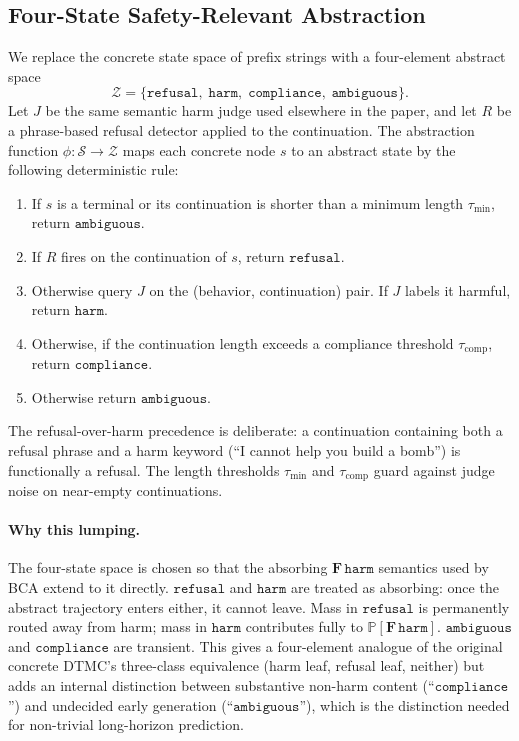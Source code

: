 \documentclass[11pt]{article}
\newcommand{\Prob}{\mathbb{P}}
\newcommand{\calS}{\mathcal{S}}
\newcommand{\calZ}{\mathcal{Z}}
\newcommand{\harm}{\texttt{harm}}
\newcommand{\refusal}{\texttt{refusal}}
\newcommand{\compliance}{\texttt{compliance}}
\newcommand{\ambiguous}{\texttt{ambiguous}}
\newcommand{\BCA}{\textsc{BCA}}
\newcommand{\DTMC}{\textsc{DTMC}}
\begin{document}
\subsection{Four-State Safety-Relevant Abstraction}

We replace the concrete state space of prefix strings with a four-element abstract space
\[
  \calZ = \{\refusal,\;\harm,\;\compliance,\;\ambiguous\}.
\]
Let $J$ be the same semantic harm judge used elsewhere in the paper, and let $R$ be a phrase-based refusal detector applied to the continuation.  The abstraction function $\phi : \calS \to \calZ$ maps each concrete node $s$ to an abstract state by the following deterministic rule:

\begin{enumerate}[leftmargin=*,itemsep=2pt]
  \item If $s$ is a terminal or its continuation is shorter than a minimum length $\tau_\mathrm{min}$, return $\ambiguous$.
  \item If $R$ fires on the continuation of $s$, return $\refusal$.
  \item Otherwise query $J$ on the (behavior, continuation) pair.  If $J$ labels it harmful, return $\harm$.
  \item Otherwise, if the continuation length exceeds a compliance threshold $\tau_\mathrm{comp}$, return $\compliance$.
  \item Otherwise return $\ambiguous$.
\end{enumerate}

The refusal-over-harm precedence is deliberate: a continuation containing both a refusal phrase and a harm keyword (``I cannot help you build a bomb'') is functionally a refusal.  The length thresholds $\tau_\mathrm{min}$ and $\tau_\mathrm{comp}$ guard against judge noise on near-empty continuations.

\paragraph{Why this lumping.}  The four-state space is chosen so that the absorbing $\mathbf{F}\,\harm$ semantics used by \BCA{} extend to it directly.  $\refusal$ and $\harm$ are treated as absorbing: once the abstract trajectory enters either, it cannot leave.  Mass in $\refusal$ is permanently routed away from harm; mass in $\harm$ contributes fully to $\Prob[\mathbf{F}\,\harm]$.  $\ambiguous$ and $\compliance$ are transient.  This gives a four-element analogue of the original concrete \DTMC's three-class equivalence (harm leaf, refusal leaf, neither) but adds an internal distinction between substantive non-harm content (``$\compliance$'') and undecided early generation (``$\ambiguous$''), which is the distinction needed for non-trivial long-horizon prediction.
\end{document}
